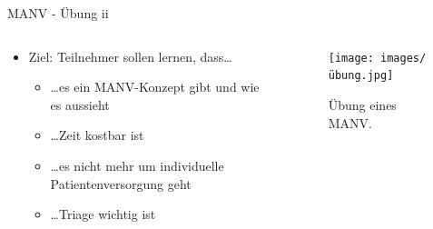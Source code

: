 \begin{frame}{MANV - Übung ii}
	\begin{columns}
		\begin{column}{0.7\textwidth}
			\begin{itemize}
				\item Ziel: Teilnehmer sollen lernen, dass\dots
				      \begin{itemize}
					      \item \dots es ein MANV-Konzept gibt und wie es aussieht
					      \item \dots Zeit kostbar ist
					      \item \dots es nicht mehr um individuelle Patientenversorgung geht
					      \item \dots Triage wichtig ist
				      \end{itemize}
			\end{itemize}
		\end{column}
		\begin{column}{0.3\textwidth}
			\begin{figure}
				\begin{center}
					\texttt{[image: images/übung.jpg]}
				\end{center}
				\caption{Übung eines MANV.}\label{fig:übung}
			\end{figure}
		\end{column}
	\end{columns}
\end{frame}
